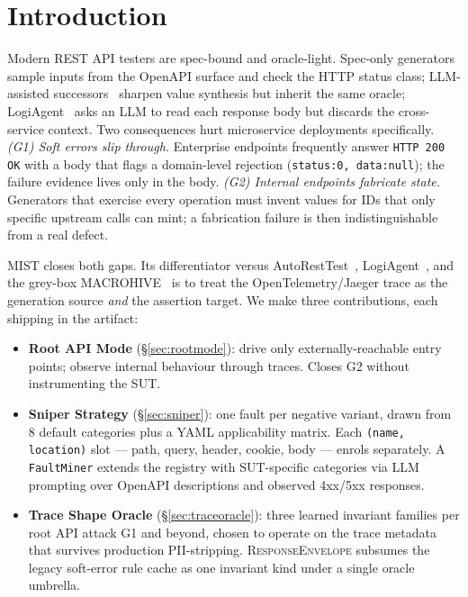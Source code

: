 \documentclass[10pt,conference]{IEEEtran}
\begin{document}
\section{Introduction}\label{sec:intro}

Modern REST API testers are spec-bound and oracle-light. Spec-only generators~\cite{Arcuri2019EvoMasterTOSEM,Atlidakis2019RESTler,MartinLopez2021RESTest,Liu2022MoRest,Kim2023ARATRL,Corradini2024DeepREST,HatfieldDodds2022Schemathesis} sample inputs from the OpenAPI surface and check the HTTP status class; LLM-assisted successors~\cite{Kim2024RESTGPT,Kim2025LlamaRestTest,Stennett2025AutoRestTest} sharpen value synthesis but inherit the same oracle; LogiAgent~\cite{Zhang2025LogiAgent} asks an LLM to read each response body but discards the cross-service context. Two consequences hurt microservice deployments specifically. \emph{(G1) Soft errors slip through.} Enterprise endpoints frequently answer \texttt{HTTP 200 OK} with a body that flags a domain-level rejection (\texttt{status:0, data:null}); the failure evidence lives only in the body. \emph{(G2) Internal endpoints fabricate state.} Generators that exercise every operation must invent values for IDs that only specific upstream calls can mint; a fabrication failure is then indistinguishable from a real defect.

MIST closes both gaps. Its differentiator versus AutoRestTest~\cite{Stennett2025AutoRestTest}, LogiAgent~\cite{Zhang2025LogiAgent}, and the grey-box MACROHIVE~\cite{Giamattei2022MACROHIVE,Giamattei2024MACROHIVE} is to treat the OpenTelemetry/Jaeger trace as the generation source \emph{and} the assertion target. We make three contributions, each shipping in the artifact:

\begin{itemize}\setlength{\itemsep}{1pt}
  \item \textbf{Root API Mode} (\S\ref{sec:rootmode}): drive only externally-reachable entry points; observe internal behaviour through traces. Closes G2 without instrumenting the SUT.
  \item \textbf{Sniper Strategy} (\S\ref{sec:sniper}): one fault per negative variant, drawn from 8 default categories plus a YAML applicability matrix. Each \texttt{(name, location)} slot --- path, query, header, cookie, body --- enrols separately. A \texttt{FaultMiner} extends the registry with SUT-specific categories via LLM prompting over OpenAPI descriptions and observed 4xx/5xx responses.
  \item \textbf{Trace Shape Oracle} (\S\ref{sec:traceoracle}): three learned invariant families per root API attack G1 and beyond, chosen to operate on the trace metadata that survives production PII-stripping. \textsc{ResponseEnvelope} subsumes the legacy soft-error rule cache as one invariant kind under a single oracle umbrella.
\end{itemize}
\end{document}
